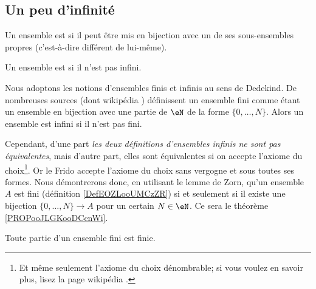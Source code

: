 \subsection{Un peu d'infinité}

\begin{definition}      \label{DefEOZLooUMCzZR}
	Un ensemble est  si il peut être mis en bijection avec un de ses sous-ensembles propres (c'est-à-dire différent de lui-même).

	Un ensemble est  si il n'est pas infini.
\end{definition}

\begin{normaltext}
	Nous adoptons les notions d'ensembles finis et infinis au sens de Dedekind. De nombreuses sources (dont wikipédia \cite{BIBooJYONooLCnCtQ,BIBooPARTooZDteDq}) définissent un ensemble fini comme étant un ensemble en bijection avec une partie de \( \eN\) de la forme \( \{ 0,\ldots, N \}\). Alors un ensemble est infini si il n'est pas fini.

	Cependant, d'une part \emph{les deux définitions d'ensembles infinis ne sont pas équivalentes}, mais d'autre part, elles sont équivalentes si on accepte l'axiome du choix\footnote{Et même seulement l'axiome du choix dénombrable; si vous voulez en savoir plus, lisez la page wikipédia \cite{BIBooSPDRooHTpBqh}.}. Or le Frido accepte l'axiome du choix sans vergogne et sous toutes ses formes. Nous démontrerons donc, en utilisant le lemme de Zorn, qu'un ensemble \( A\) est fini (définition \ref{DefEOZLooUMCzZR}) si et seulement si il existe une bijection \( \{ 0,\ldots, N \}\to A\) pour un certain \( N\in \eN\). Ce sera le théorème  \ref{PROPooJLGKooDCcnWi}.
\end{normaltext}


\begin{lemma}       \label{LEMooTUIRooEXjfDY}
	Toute partie d'un ensemble fini est finie.
\end{lemma}


